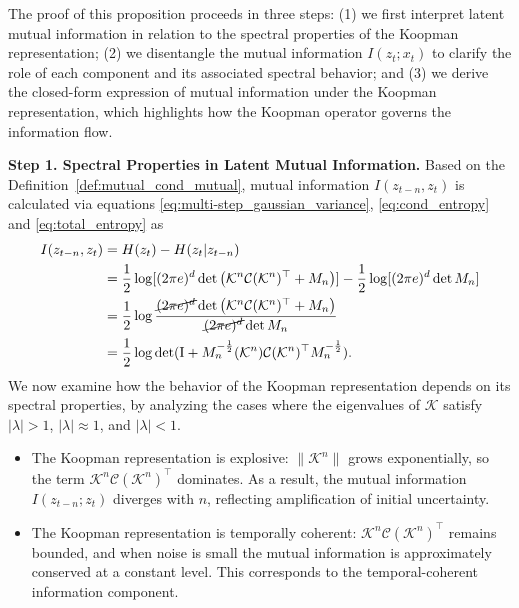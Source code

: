 \documentclass{article} %
\begin{document}
\begin{proofwithframe} The proof of this proposition proceeds in three steps: (1) we first interpret latent mutual information in relation to the spectral properties of the Koopman representation; (2) we disentangle the mutual information $I(z_t; x_t)$ to clarify the role of each component and its associated spectral behavior; and (3) we derive the closed-form expression of mutual information under the Koopman representation, which highlights how the Koopman operator governs the information flow.

\textbf{Step 1. Spectral Properties in Latent Mutual Information.} Based on the Definition~\ref{def:mutual_cond_mutual}, mutual information $I(z_{t-n}, z_t)$ is calculated via equations \ref{eq:multi-step_gaussian_variance},  \ref{eq:cond_entropy} and \ref{eq:total_entropy} as 
\begin{equation} \label{eq:latent_mutual_info_closed_form}
\begin{split}
    I(z_{t-n}, z_t) & = H(z_t) - H(z_{t}|z_{t-n}) \\
    & = \frac{1}{2} \log [(2\pi e)^d \det \big(\mathcal{K}^n \mathcal{C} (\mathcal{K}^n)^{\top} + M_n \big)] - \frac{1}{2}\log[(2\pi e)^d \det M_n ] \\
    & = \frac{1}{2} \log \frac{\cancel{(2\pi e)^d} \det \big(\mathcal{K}^n \mathcal{C} (\mathcal{K}^n)^{\top} + M_n \big)}{\cancel{(2\pi e)^d} \det M_n} \\
    & =\frac{1}{2} \log \det(\mathrm{I} + M_n^{-\frac{1}{2}}(\mathcal{K}^{n})\mathcal{C}(\mathcal{K}^{n})^{\top}M_n^{-\frac{1}{2}}).
\end{split}
\end{equation}
We now examine how the behavior of the Koopman representation depends on its spectral properties, by analyzing the cases where the eigenvalues of $\mathcal{K}$ satisfy $|\lambda|>1$, $|\lambda|\approx 1$, and $|\lambda|<1$.

\begin{itemize}
    \item[$|\lambda|>1$:] The Koopman representation is explosive: $\|\mathcal{K}^n\|$ grows exponentially, so the term 
    $\mathcal{K}^n \mathcal{C} (\mathcal{K}^n)^{\top}$ dominates. As a result, the mutual information 
    $I(z_{t-n};z_t)$ diverges with $n$, reflecting amplification of initial uncertainty. 
    
    \item[$|\lambda|\approx 1$:] The Koopman representation is temporally coherent: $\mathcal{K}^n \mathcal{C} (\mathcal{K}^n)^{\top}$ remains bounded, and when noise is small the mutual information is approximately conserved at a constant level. This corresponds to the temporal-coherent information component. 
    

\end{itemize}
\end{proofwithframe}
\end{document}
